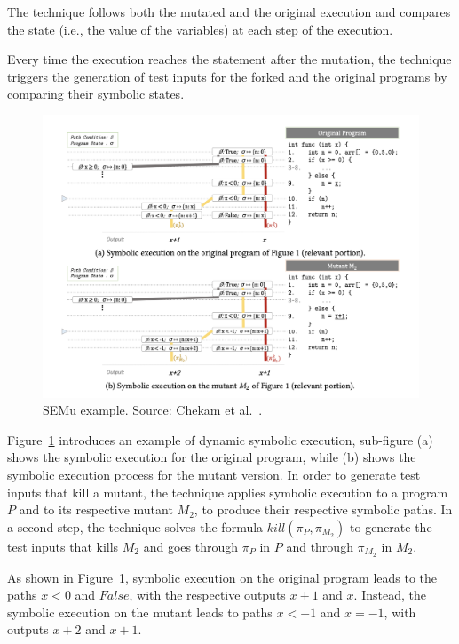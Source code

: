 The technique follows both the mutated and the original execution and compares the state (i.e., the value of the variables) at each step of the execution.

Every time the execution reaches the statement after the mutation, the technique triggers the generation of test inputs for the forked and the original programs by comparing their symbolic states.

\begin{figure}[tb]
\begin{center}
\includegraphics[width=\textwidth]{images/semu-example}
\caption{SEMu example. Source: Chekam et al.~\cite{chekam2021killing}.}
\label{fig:semu-example}
\end{center}
\end{figure}

Figure~\ref{fig:semu-example} introduces an example of dynamic symbolic execution, sub-figure (a) shows the symbolic execution for the original program, while (b) shows the symbolic execution process for the mutant version. In order to generate test inputs that kill a mutant, the technique applies symbolic execution to a program $P$ and to its respective mutant $M_2$, to produce their respective symbolic paths. In a second step, the technique solves the formula $kill(\pi_P, \pi_{M_2})$ to generate the test inputs that kills $M_2$ and goes through $\pi_P$ in $P$ and through $\pi_{M_2}$ in $M_2$. 

As shown in Figure~\ref{fig:semu-example}, symbolic execution on the original program leads to the paths $x < 0$ and $False$, with the respective outputs $x + 1$ and $x$.
Instead, the symbolic execution on the mutant leads to paths $x < -1$ and $x = -1$, with outputs $x + 2$ and $x + 1$.

